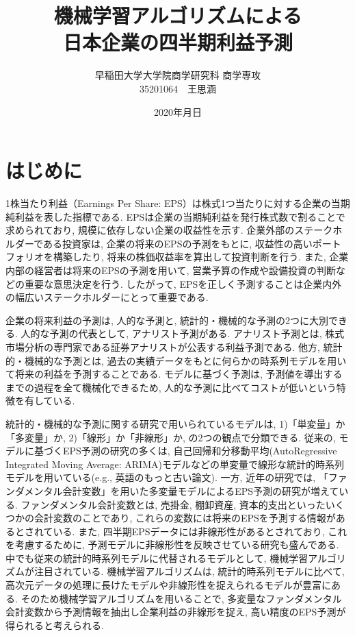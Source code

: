 \documentclass[a4paper, 12pt]{jsarticle}
\title{機械学習アルゴリズムによる\\
  日本企業の四半期利益予測}
\author{早稲田大学大学院商学研究科 商学専攻\\
  35201064　王思涵}
\date{2020年月日}
\begin{document}
\maketitle
\tableofcontents

\part{はじめに}

1株当たり利益（Earnings Per Share: EPS）は株式1つ当たりに対する企業の当期純利益を表した指標である. EPSは企業の当期純利益を発行株式数で割ることで求められており, 規模に依存しない企業の収益性を示す. 企業外部のステークホルダーである投資家は, 企業の将来のEPSの予測をもとに, 収益性の高いポートフォリオを構築したり, 将来の株価収益率を算出して投資判断を行う. また, 企業内部の経営者は将来のEPSの予測を用いて, 営業予算の作成や設備投資の判断などの重要な意思決定を行う. したがって, EPSを正しく予測することは企業内外の幅広いステークホルダーにとって重要である. 

企業の将来利益の予測は, 人的な予測と, 統計的・機械的な予測の2つに大別できる\citep{sakurai1990}. 人的な予測の代表として, アナリスト予測がある. アナリスト予測とは, 株式市場分析の専門家である証券アナリストが公表する利益予測である. 他方, 統計的・機械的な予測とは, 過去の実績データをもとに何らかの時系列モデルを用いて将来の利益を予測することである. モデルに基づく予測は, 予測値を導出するまでの過程を全て機械化できるため, 人的な予測に比べてコストが低いという特徴を有している\citep{sakurai1990}. 

統計的・機械的な予測に関する研究で用いられているモデルは, 1)「単変量」か「多変量」か, 2)「線形」か「非線形」か, の2つの観点で分類できる\citep{zhang2004neural}. 従来の, モデルに基づくEPS予測の研究の多くは, 自己回帰和分移動平均(AutoRegressive Integrated Moving Average: ARIMA)モデル\citep*{box2015time}などの単変量で線形な統計的時系列モデルを用いている(e.g., 英語のもっと古い論文). 一方, 近年の研究では, 「ファンダメンタル会計変数」を用いた多変量モデルによるEPS予測の研究が増えている. ファンダメンタル会計変数とは, 売掛金, 棚卸資産, 資本的支出といったいくつかの会計変数のことであり, これらの変数には将来のEPSを予測する情報があるとされている\citep{lev1993fundamental, abarbanell1997fundamental}. また, 四半期EPSデータには非線形性があるとされており\citep*{hopwood1986univariate}, これを考慮するために, 予測モデルに非線形性を反映させている研究も盛んである. 中でも従来の統計的時系列モデルに代替されるモデルとして, 機械学習アルゴリズムが注目されている. 機械学習アルゴリズムは, 統計的時系列モデルに比べて, 高次元データの処理に長けたモデルや非線形性を捉えられるモデルが豊富にある\citep*{cao2020fundamental}. そのため機械学習アルゴリズムを用いることで, 多変量なファンダメンタル会計変数から予測情報を抽出し企業利益の非線形を捉え, 高い精度のEPS予測が得られると考えられる. 
\end{document}
